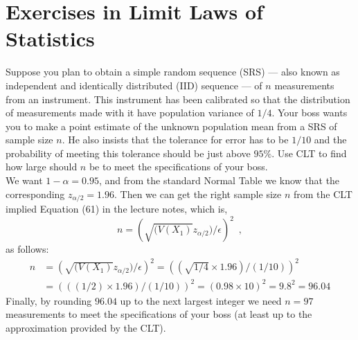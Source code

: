 \section{Exercises in Limit Laws of Statistics}\label{S:xsLimitLaws}%

\begin{ExerciseList}

\Exercise
Suppose you plan to obtain a simple random sequence (SRS) --- also known as independent and identically distributed (IID) sequence --- of $n$ measurements from an instrument.  
This instrument has been calibrated so that the distribution of measurements made with it have population variance of $1/4$.  
Your boss wants you to make a point estimate of the unknown population mean from a SRS of sample size $n$.  
He also insists that the tolerance for error has to be $1/10$ and the probability of meeting this tolerance should be just above $95\%$.  
Use CLT to find how large should $n$ be to meet the specifications of your boss.
\Answer
~\\
We want $1-\alpha = 0.95$, and from the standard Normal Table we know that the corresponding $z_{\alpha/2}=1.96$.   
Then we can get the right sample size $n$ from the CLT implied Equation (61) in the lecture notes, which is,
\[
n = \left( \sqrt{(V(X_1)} z_{\alpha/2}) / \epsilon \right)^2 \enspace ,
\] 
as follows:
\begin{eqnarray*}
n &= \left( \sqrt{(V(X_1)} z_{\alpha/2}) / \epsilon \right)^2 = \left( (\sqrt{1/4}\times 1.96) / (1/10) \right)^2\\
&= \left( ((1/2)\times 1.96) / (1/10) \right)^2 = (0.98 \times 10)^2 = 9.8^2 = 96.04
\end{eqnarray*}
Finally, by rounding $96.04$ up to the next largest integer we need $n=97$ measurements to meet the specifications of your boss (at least up to the approximation provided by the CLT).



\end{ExerciseList}
